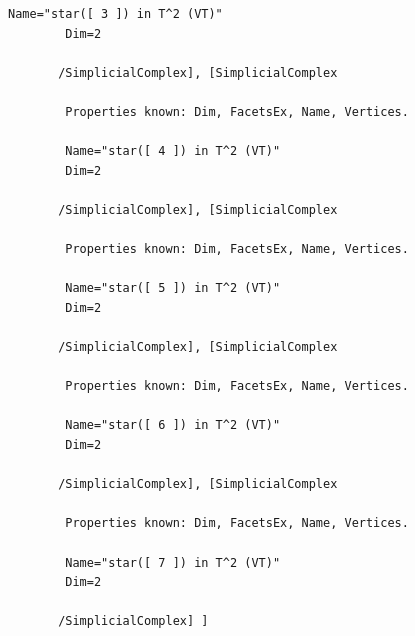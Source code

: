\documentclass[a4paper,11pt]{report}
\begin{document}
{{{\begin{Verbatim}[commandchars=!@|,fontsize=\small,frame=single,label=Example]
        Name="star([ 3 ]) in T^2 (VT)"
        Dim=2
       
       /SimplicialComplex], [SimplicialComplex
       
        Properties known: Dim, FacetsEx, Name, Vertices.
       
        Name="star([ 4 ]) in T^2 (VT)"
        Dim=2
       
       /SimplicialComplex], [SimplicialComplex
       
        Properties known: Dim, FacetsEx, Name, Vertices.
       
        Name="star([ 5 ]) in T^2 (VT)"
        Dim=2
       
       /SimplicialComplex], [SimplicialComplex
       
        Properties known: Dim, FacetsEx, Name, Vertices.
       
        Name="star([ 6 ]) in T^2 (VT)"
        Dim=2
       
       /SimplicialComplex], [SimplicialComplex
       
        Properties known: Dim, FacetsEx, Name, Vertices.
       
        Name="star([ 7 ]) in T^2 (VT)"
        Dim=2
       
       /SimplicialComplex] ]
   
\end{Verbatim}
 }

 }

 }
\end{document}
